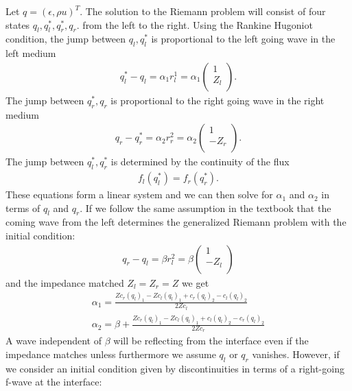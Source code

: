 \documentclass{article}
\begin{document}
Let $q=(\epsilon,\rho u)^T$. The solution to the Riemann problem will consist of four states $q_l,q_l^*,q_r^*,q_r$. from the left to the right. Using the Rankine Hugoniot condition, the jump between $q_l,q_l^*$ is proportional to the left going wave in the left medium
\begin{align}
q_l^*-q_l=\alpha_1 r^1_l=\alpha_1   \left( \begin{array}{c}
                      1 \\
                      Z_l \\
                    \end{array}\right).
\end{align}
The jump between $q_r^*,q_r$ is proportional to the right going wave in the right medium
\begin{align}
q_r-q_r^*=\alpha_2 r^2_r=\alpha_2   \left( \begin{array}{c}
                      1 \\
                      -Z_r \\
                    \end{array}\right).
\end{align}
The jump between $q_l^*,q_r^*$ is determined by the continuity of the flux
\begin{align}
f_l(q_l^*)=f_r(q_r^*).
\end{align}
These equations form a linear system and we can then solve for $\alpha_1$ and $\alpha_2$ in terms of $q_l$ and $q_r$. If we follow the same assumption in the textbook that the coming wave from the left determines the generalized Riemann problem with the initial condition:
\begin{align}
q_r-q_l=\beta r^2_l=\beta\left( \begin{array}{c}
                      1 \\
                      -Z_l \\
                    \end{array}\right)
\end{align}
and the impedance matched $Z_l=Z_r=Z$
we get
\begin{align}
\alpha_1=  \frac {Z c_r (q_l)_1 -Z c_l (q_l)_1 + c_r (q_l)_2 - c_l (q_l)_2 }{2 Z c_l}\\
\alpha_2=  \beta+\frac {Z c_r (q_l)_1 -Z c_l (q_l)_1 + c_l (q_l)_2 - c_r (q_l)_2 }{2 Z c_r}
\end{align}
A wave independent of $\beta$ will be reflecting from the interface even if the impedance matches unless furthermore we assume $q_l$ or $q_r$ vanishes. However, if we consider an initial condition given by discontinuities in terms of a right-going f-wave at the interface:
\end{document}
